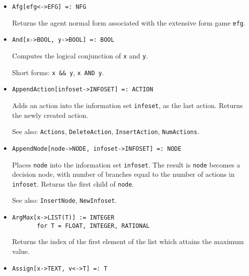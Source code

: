 \begin{itemize}
\item
\protect \large \begin{verbatim}
Afg[efg<->EFG] =: NFG
\end{verbatim}\normalsize

\bd
Returns the agent normal form associated with the extensive form game
\verb+efg+.
\ed


\item 
\protect \large \begin{verbatim}
And[x->BOOL, y->BOOL] =: BOOL
\end{verbatim} \normalsize

\bd
Computes the logical conjunction of \verb+x+ and \verb+y+.
\item
[Short forms:] \verb+x && y+, \verb+x AND y+.
\ed


\item
\protect \large \begin{verbatim}
AppendAction[infoset->INFOSET] =: ACTION
\end{verbatim}\normalsize

\bd
Adds an action into the information set \verb+infoset+,
as the last action.  Returns the newly created action.
\item
[See also:] {\tt Actions}, {\tt DeleteAction}, {\tt InsertAction},
{\tt NumActions}.
\ed


\item
\protect \large \begin{verbatim} 
AppendNode[node->NODE, infoset->INFOSET] =: NODE
\end{verbatim}\normalsize

\bd
Places \verb+node+ into the information set
\verb+infoset+.  The result is \verb+node+ becomes a decision node,
with number of branches equal to the number of actions in \verb+infoset+.
Returns the first child of \verb+node+.
\item
[See also:] {\tt InsertNode}, {\tt NewInfoset}.
\ed


\item 
\protect \large \begin{verbatim}
ArgMax[x->LIST(T)] := INTEGER
       for T = FLOAT, INTEGER, RATIONAL
\end{verbatim} \normalsize

\bd
Returns the index of the first element of the list which attains the
maximum value. 
\ed

\item 
\protect \large \begin{verbatim}
Assign[x->TEXT, v<->T] =: T
\end{verbatim} \normalsize


\end{itemize}
